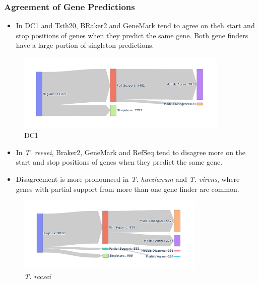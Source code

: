 \documentclass[t]{beamer}
\begin{document}
\begin{frame}
	\frametitle{Agreement of Gene Predictions}
	\centering
	\begin{itemize}
		\item In DC1 and Tsth20, BRaker2 and GeneMark tend to agree on theh start and stop positions of genes when they predict the same gene. Both gene finders have a large portion of singleton predictions.
	\end{itemize}
	\begin{figure}
		\includegraphics[width=0.9\textwidth]{../../working-thesis/figures/dc1-region-breakdown.png}
		\caption{DC1}
	\end{figure}
\end{frame}

\begin{frame}
	\vspace{1cm}
	\centering
	\begin{itemize}
		\item In \textit{T. reesei}, Braker2, GeneMark and RefSeq tend to disagree more on the start and stop positions of genes when they predict the same gene.
		\item Disagreement is more pronounced in \textit{T. harzianum} and \textit{T. virens}, where genes with partial support from more than one gene finder are common.
		
	\end{itemize}
	\begin{figure}
		\includegraphics[width=0.8\textwidth]{../../working-thesis/figures/t-reesei-region-breakdown.png}
		\caption{\textit{T. reesei}}
	\end{figure}
\end{frame}
\end{document}
